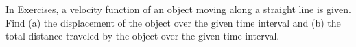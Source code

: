 \begin{exerciseset}{In Exercises}{, a velocity function of an object moving along a straight line is given. Find (a) the displacement of the object over the given time interval and (b) the total distance traveled by the object over the given time interval.}






\end{exerciseset}
